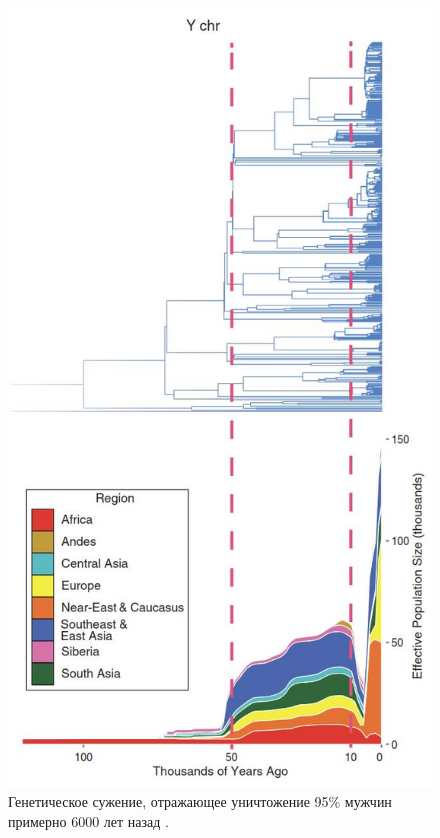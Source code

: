 \documentclass[10pt,twocolumn,letterpaper]{article}
\begin{document}
\begin{figure}[b]
\begin{center}
   \includegraphics[width=1\linewidth]{bottleneck.jpg}
\end{center}
   \caption{Генетическое сужение, отражающее уничтожение 95\% мужчин примерно 6000 лет назад \cite{62}.}
\label{fig:10}
\label{fig:onecol}
\end{figure}
\end{document}
